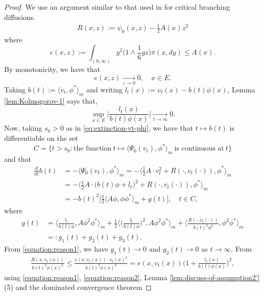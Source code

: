 \documentclass[UTF8]{pkuthss}
\theoremstyle{plain}
\theoremstyle{definition}
\numberwithin{equation}{section}
\begin{document}
\begin{proof}
	We use an argument similar to that used in \cite{Powell2019Invariance} for critical branching diffusions.
\begin{align}
	R(x,z)
	:=\psi_0(x,z)-\frac{1}{2} A(x)z^2
\end{align}
	where
\[
	e(x,z)
	:=\int_{(0,\infty)}y^2\big(1\wedge \frac{1}{6}yz\big)\pi(x,dy)
	\leq  A(x).	
\]
	By monotonicity, we have that
\begin{equation}\label{equation:reason2}
	e(x,z)
	\xrightarrow[z\to 0]{} 0,
	\quad x\in E.
\end{equation}
	Taking $b(t):=\langle v_t,\phi^*\rangle_m$ and writing $l_t(x):=v_t(x)-b(t)\phi(x)$, Lemma \ref{lem:Kolmogorov-1} says that,
\begin{equation}\label{equation:reason1}
	\sup_{x\in E}\Big|\frac{l_t(x)}{b(t)\phi(x)}\Big|
	\xrightarrow[t\to\infty]{} 0.
\end{equation}
	Now, taking $s_0>0$ as in \eqref{eq:extinction-vt-phi},
	we have that $t\mapsto b(t)$ is differentiable on the set
\[
	C
	=\{t> s_0: \text{the function}~ t \mapsto \langle\Psi_0(v_t),\phi^*\rangle_m~ \text{is continuous at}~ t \}
\]
	and that
\begin{align}\label{equation:b(t)}
	\frac{d}{dt}b(t)
	&= -\langle\Psi_0(v_t),\phi^*\rangle_m
	= -\big\langle \frac{1}{2} A \cdot v_t^2+R (\cdot,v_t(\cdot)),\phi^*\big\rangle_m \\
	&= -\big\langle \frac{1}{2}  A \cdot \big(b(t)\phi+l_t\big)^2+R (\cdot,v_t(\cdot)),\phi^*\big\rangle_m\\
	&= -b(t)^2\big[\frac{1}{2} \langle  A\phi,\phi \phi^*\rangle_m+g(t)\big],
	\quad t\in C,
\end{align}	
	where
\begin{align}
	g(t)
	&= \Big\langle \frac{l_t}{b(t) \phi}, A\phi^2\phi^*\Big\rangle_m + \frac{1}{2}\Big\langle \Big(\frac{l_t}{b(t) \phi}\Big)^2, A\phi^2\phi^*\Big\rangle_m + \Big\langle \frac{R(\cdot,v_t(\cdot))}{b(t)^2 \phi^2},\phi^2\phi^*\Big\rangle_m \\
	&=: g_1(t) + g_2(t) + g_3(t).
\end{align}
	From \eqref{equation:reason1}, we have $g_1(t)\to 0$ and $g_2(t)\to 0$ as $t\to\infty$.
	From
\begin{align}
	\frac{R(x,v_t(x))}{b(t)^2 \phi(x)^2}
	\leq \frac{e(x,v_t(x))\cdot v_t(x)^2}{ b(t)^2\phi(x)^2}
	= e(x,v_t(x))\Big(1+\frac{l_t(x)}{ b(t) \phi(x)}\Big)^2,
\end{align}
	using \eqref{equation:reason1}, \eqref{equation:reason2}, Lemma \ref{lem:discuss-of-assumption2'} (5) and the dominated convergence theorem 

\end{proof}
\end{document}
